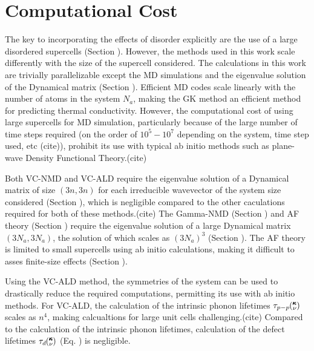 \documentclass[aps,prb,twocolumn,superscriptaddress,amsmath,amssymb,floatfix]{revtex4}
\newcommand{\kv}{\mspace{-4.0mu}\left(\mspace{-8.0mu}
\begin{smallmatrix}&\pmb{\kappa} \\&\nu\end{smallmatrix}
\mspace{-3.0mu}\right)}
\begin{document}
\section{\label{A:Computational Cost}
Computational Cost}

The key to incorporating the effects of disorder explicitly are the use 
of a large disordered supercells (Section ).  However, the methods used 
in this work scale differently with the size of the supercell considered. 
The calculations in this work are trivially parallelizable\cite{} 
except the 
MD simulations\cite{plimpton_fast_1995} and the eigenvalue solution of the 
Dynamical matrix (Section ).\cite{gale_general_2003} Efficient MD 
codes scale linearly with the number of atoms in the system $N_a$, making 
the GK method an efficient method for predicting thermal conductivity. 
However, the computational cost of using large supercells for MD simulation, 
particularly because of the large number of time steps required 
(on the order of $10^5 - 10^7$ depending on the 
system, time step used, etc (cite)), prohibit its use with typical 
ab initio methods such as plane-wave Density Functional Theory.(cite) 

Both VC-NMD and VC-ALD require the eigenvalue solution 
of a Dynamical matrix of size $(3n,3n)$ for each irreducible wavevector 
of the system size considered (Section ), 
which is negligible compared to the other 
caculations required for both of these methods.(cite) 
The Gamma-NMD (Section ) and AF theory (Section ) 
require the eigenvalue solution of a large Dynamical matrix $(3N_a,3N_a)$, 
the solution of which scales as $(3N_a)^3$ (Section ). 
The AF theory is limited 
to small supercells using ab initio calculations, making it difficult 
to asses finite-size effects (Section ).  

Using the VC-ALD method, the symmetries of the system can be 
used to drastically reduce the required computations, permitting its 
use with ab initio methods.
\cite{esfarjani_method_2008,turney_predicting_2009,
esfarjani_heat_2011,chaput_phonon-phonon_2011} 
For VC-ALD, the calculation of the intrinsic phonon 
lifetimes $\tau_{p-p}\kv$ scales as $n^4$,\cite{turney_predicting_2009}  
making calcualtions for large unit cells challenging.(cite) 
Compared to 
the calculation of the intrinsic phonon lifetimes, calculation 
of the defect lifetimes $\tau_d\kv$ (Eq. ) is negligible.
\end{document}
